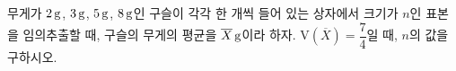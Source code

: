 무게가 $2\mkern3mu \mathrm{g}$, $3\mkern3mu \mathrm{g}$, $5\mkern3mu \mathrm{g}$, $8\mkern3mu \mathrm{g}$인 구슬이 각각 한 개씩 들어 있는 상자에서 크기가 $n$인 표본을 임의추출할 때, 구슬의 무게의 평균을 $\overline{X}\mkern3mu \mathrm{g}$이라 하자. $\mathrm{V}(\overline{X})=\dfrac{7}{4}$일 때, $n$의 값을 구하시오.
